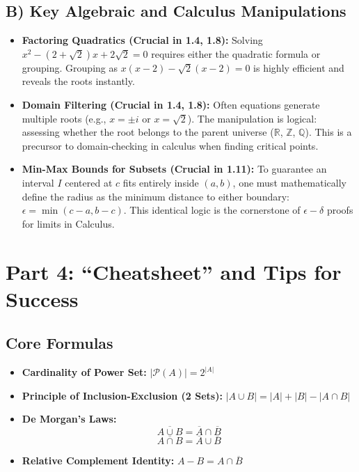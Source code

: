 \documentclass[12pt]{article}
\begin{document}
\subsection{B) Key Algebraic and Calculus Manipulations}
\begin{itemize}
    \item \textbf{Factoring Quadratics (Crucial in 1.4, 1.8):} 
    Solving $x^2 - (2 + \sqrt{2})x + 2\sqrt{2} = 0$ requires either the quadratic formula or grouping. Grouping as $x(x - 2) - \sqrt{2}(x - 2) = 0$ is highly efficient and reveals the roots instantly.
    \item \textbf{Domain Filtering (Crucial in 1.4, 1.8):} 
    Often equations generate multiple roots (e.g., $x = \pm i$ or $x = \sqrt{2}$). The manipulation is logical: assessing whether the root belongs to the parent universe ($\mathbb{R}$, $\mathbb{Z}$, $\mathbb{Q}$). This is a precursor to domain-checking in calculus when finding critical points.
    \item \textbf{Min-Max Bounds for Subsets (Crucial in 1.11):} 
    To guarantee an interval $I$ centered at $c$ fits entirely inside $(a,b)$, one must mathematically define the radius as the minimum distance to either boundary: $\epsilon = \min(c-a, b-c)$. This identical logic is the cornerstone of $\epsilon-\delta$ proofs for limits in Calculus.
\end{itemize}

\newpage
\section{Part 4: ``Cheatsheet'' and Tips for Success}

\subsection{Core Formulas}
\begin{itemize}
    \item \textbf{Cardinality of Power Set:} $|\mathcal{P}(A)| = 2^{|A|}$
    \item \textbf{Principle of Inclusion-Exclusion (2 Sets):} $|A \cup B| = |A| + |B| - |A \cap B|$
    \item \textbf{De Morgan's Laws:} 
    \[ \overline{A \cup B} = \overline{A} \cap \overline{B} \]
    \[ \overline{A \cap B} = \overline{A} \cup \overline{B} \]
    \item \textbf{Relative Complement Identity:} $A - B = A \cap \overline{B}$
\end{itemize}
\end{document}
